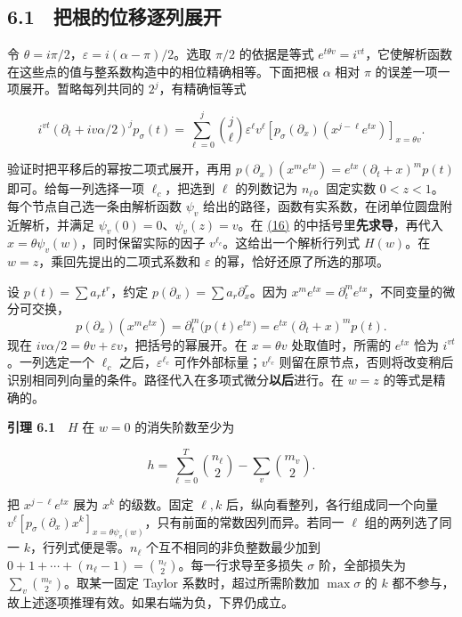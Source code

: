 \documentclass[11pt,a4paper]{article}
\begin{document}
\subsection{6.1　把根的位移逐列展开}\label{ux628aux6839ux7684ux4f4dux79fbux9010ux5217ux5c55ux5f00}

令 \(\theta=i\pi/2\)，\(\varepsilon=i(\alpha-\pi)/2\)。选取 \(\pi/2\) 的依据是等式 \(e^{t\theta v}=i^{vt}\)，它使解析函数在这些点的值与整系数构造中的相位精确相等。下面把根 \(\alpha\) 相对 \(\pi\) 的误差一项一项展开。暂略每列共同的 \(2^j\)，有精确恒等式

\[
 i^{vt}(\partial_t+iv\alpha/2)^jp_\sigma(t)
 =\sum_{\ell=0}^j\binom j\ell\varepsilon^\ell v^\ell
      [p_\sigma(\partial_x)(x^{j-\ell}e^{tx})]_{x=\theta v}.              \tag{16}\label{eq:16}
\]

验证时把平移后的幂按二项式展开，再用 \(p(\partial_x)(x^m e^{tx})=e^{tx}(\partial_t+x)^mp(t)\) 即可。给每一列选择一项 \(\ell_c\)，把选到 \(\ell\) 的列数记为 \(n_\ell\)。固定实数 \(0<z<1\)。每个节点自己选一条由解析函数 \(\psi_v\) 给出的路径，函数有实系数，在闭单位圆盘附近解析，并满足 \(\psi_v(0)=0\)、\(\psi_v(z)=v\)。在 \hyperref[eq:16]{(16)} 的中括号里\textbf{先求导}，再代入 \(x=\theta\psi_v(w)\)，同时保留实际的因子 \(v^{\ell_c}\)。这给出一个解析行列式 \(H(w)\)。在 \(w=z\)，乘回先提出的二项式系数和 \(\varepsilon\) 的幂，恰好还原了所选的那项。

设 \(p(t)=\sum a_rt^r\)，约定 \(p(\partial_x)=\sum a_r\partial_x^r\)。因为 \(x^me^{tx}=\partial_t^m e^{tx}\)，不同变量的微分可交换， \[
 p(\partial_x)(x^me^{tx})=\partial_t^m\big(p(t)e^{tx}\big)
 =e^{tx}(\partial_t+x)^mp(t).
\] 现在 \(iv\alpha/2=\theta v+\varepsilon v\)，把括号的幂展开。在 \(x=\theta v\) 处取值时，所需的 \(e^{tx}\) 恰为 \(i^{vt}\)。一列选定一个 \(\ell_c\) 之后，\(\varepsilon^{\ell_c}\) 可作外部标量；\(v^{\ell_c}\) 则留在原节点，否则将改变稍后识别相同列向量的条件。路径代入在多项式微分\textbf{以后}进行。在 \(w=z\) 的等式是精确的。

\textbf{引理 6.1}　\(H\) 在 \(w=0\) 的消失阶数至少为

\[
 h=\sum_{\ell=0}^T\binom{n_\ell}{2}-\sum_v\binom{m_v}{2}.                 \tag{17}\label{eq:17}
\]

把 \(x^{j-\ell}e^{tx}\) 展为 \(x^k\) 的级数。固定 \(\ell,k\) 后，纵向看整列，各行组成同一个向量 \(v^\ell[p_\sigma(\partial_x)x^k]_{x=\theta\psi_v(w)}\)，只有前面的常数因列而异。若同一 \(\ell\) 组的两列选了同一 \(k\)，行列式便是零。\(n_\ell\) 个互不相同的非负整数最少加到 \(0+1+\cdots+(n_\ell-1)=\binom{n_\ell}{2}\)。每一行求导至多损失 \(\sigma\) 阶，全部损失为 \(\sum_v\binom{m_v}{2}\)。取某一固定 Taylor 系数时，超过所需阶数加 \(\max\sigma\) 的 \(k\) 都不参与，故上述逐项推理有效。如果右端为负，下界仍成立。
\end{document}

